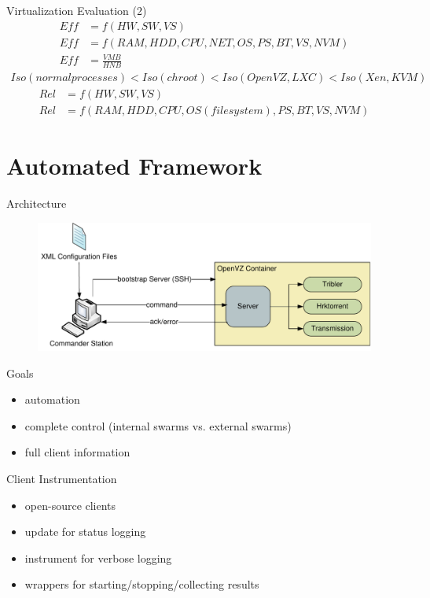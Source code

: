 \documentclass{beamer}
\begin{document}
\begin{frame}{Virtualization Evaluation (2)}
  \scriptsize
  \begin{align}
    Eff &= f(HW, SW, VS)\\
    Eff &= f(RAM, HDD, CPU, NET, OS, PS, BT, VS, NVM)\\
    Eff &= \frac{VMB}{HNB}
  \end{align}
  \begin{align}
    Iso(normal processes) < Iso(chroot) < Iso(OpenVZ, LXC) < Iso(Xen,KVM)
  \end{align}
  \begin{align}
    Rel &= f(HW, SW, VS)\\
    Rel &= f(RAM, HDD, CPU, OS (filesystem), PS, BT, VS, NVM)
  \end{align}
\end{frame}

\section{Automated Framework}

\begin{frame}{Architecture}
  \begin{figure}
    \includegraphics[scale=0.5]{img/service-arch}
  \end{figure}
\end{frame}

\begin{frame}{Goals}
  \begin{itemize}
    \item automation
    \item complete control (internal swarms vs. external swarms)
    \item full client information
  \end{itemize}
\end{frame}

\begin{frame}{Client Instrumentation}
  \begin{itemize}
    \item open-source clients
    \item update for status logging
    \item instrument for verbose logging
    \item wrappers for starting/stopping/collecting results
  \end{itemize}
\end{frame}
\end{document}
